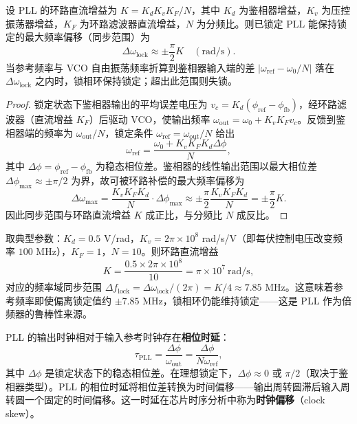 \begin{lemma}\label{ch24_pll_lock_range_lemma}
设 PLL 的环路直流增益为 $K = K_d K_v K_F / N$，其中 $K_d$ 为鉴相器增益，$K_v$ 为压控振荡器增益，$K_F$ 为环路滤波器直流增益，$N$ 为分频比。则已锁定 PLL 能保持锁定的最大频率偏移（同步范围）为
\[
\Delta\omega_{\text{lock}} \approx \pm \frac{\pi}{2} K \quad (\text{rad/s}).
\]
当参考频率与 VCO 自由振荡频率折算到鉴相器输入端的差 $|\omega_{\text{ref}} - \omega_0/N|$ 落在 $\Delta\omega_{\text{lock}}$ 之内时，锁相环保持锁定；超出此范围则失锁。
\end{lemma}

\begin{proof}
锁定状态下鉴相器输出的平均误差电压为 $v_c = K_d(\phi_{\text{ref}} - \phi_{\text{fb}})$，经环路滤波器（直流增益 $K_F$）后驱动 VCO，使输出频率 $\omega_{\text{out}} = \omega_0 + K_v K_F v_c$。反馈到鉴相器端的频率为 $\omega_{\text{out}}/N$，锁定条件 $\omega_{\text{ref}} = \omega_{\text{out}}/N$ 给出
\[
\omega_{\text{ref}} = \frac{\omega_0 + K_v K_F K_d \Delta\phi}{N},
\]
其中 $\Delta\phi = \phi_{\text{ref}} - \phi_{\text{fb}}$ 为稳态相位差。鉴相器的线性输出范围以最大相位差 $\Delta\phi_{\max} \approx \pm\pi/2$ 为界，故可被环路补偿的最大频率偏移为
\[
\Delta\omega_{\max} = \frac{K_v K_F K_d}{N}\cdot \Delta\phi_{\max} \approx \pm \frac{\pi}{2}\frac{K_v K_F K_d}{N} = \pm \frac{\pi}{2}K.
\]
因此同步范围与环路直流增益 $K$ 成正比，与分频比 $N$ 成反比。
\end{proof}

\begin{remark}[同步范围的数值例]\label{ch24_pll_lock_range_example}
取典型参数：$K_d = 0.5$ V/rad，$K_v = 2\pi\times 10^8$ rad/s/V（即每伏控制电压改变频率 $100$ MHz），$K_F = 1$，$N = 10$。则环路直流增益
\[
K = \frac{0.5 \times 2\pi\times 10^8}{10} = \pi\times 10^7\ \text{rad/s},
\]
对应的频率域同步范围 $\Delta f_{\text{lock}} = \Delta\omega_{\text{lock}}/(2\pi) = K/4 \approx 7.85$ MHz。这意味着参考频率即使偏离锁定值约 $\pm 7.85$ MHz，锁相环仍能维持锁定——这是 PLL 作为倍频器的鲁棒性来源。
\end{remark}

\begin{definition}\label{def:pll_delay}
PLL 的输出时钟相对于输入参考时钟存在\textbf{相位时延}：
\[
\tau_{\text{PLL}} = \frac{\Delta\phi}{\omega_{\text{out}}} = \frac{\Delta\phi}{N\omega_{\text{ref}}},
\]
其中 $\Delta\phi$ 是锁定状态下的稳态相位差。在理想锁定下，$\Delta\phi \approx 0$ 或 $\pi/2$（取决于鉴相器类型）。PLL 的相位时延将相位差转换为时间偏移——输出周转圆滞后输入周转圆一个固定的时间偏移。这一时延在芯片时序分析中称为\textbf{时钟偏移}（clock skew）。
\end{definition}

